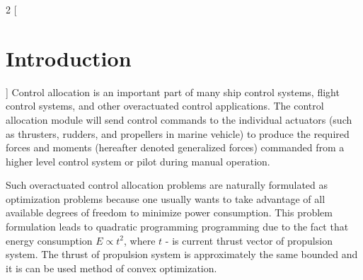 \documentclass[a0,portrait]{a0poster}
\begin{document}
\vspace{1.5cm} %
\begin{minipage}[t]{0.48\linewidth}
\begin{multicols}{2}
[
\section*{Introduction}
]
Control allocation is an important part of many ship control systems, flight control systems, and other overactuated control applications. The control allocation
module will send control commands to the individual actuators (such as thrusters, rudders, and propellers in marine vehicle) to produce the required forces and moments (hereafter denoted generalized forces) commanded from a higher level control system or pilot during manual operation.

Such overactuated control allocation problems are naturally formulated as optimization problems because one usually wants to take
advantage of all available degrees of freedom to minimize power consumption. This problem formulation leads to quadratic programming programming due to the fact that
energy consumption $E \propto t^2$, where $t$ - is current thrust vector of propulsion system. The thrust of propulsion system is approximately the same bounded and it is can be used method of convex optimization.
\end{multicols}
\end{minipage}
\hfill
\end{document}

